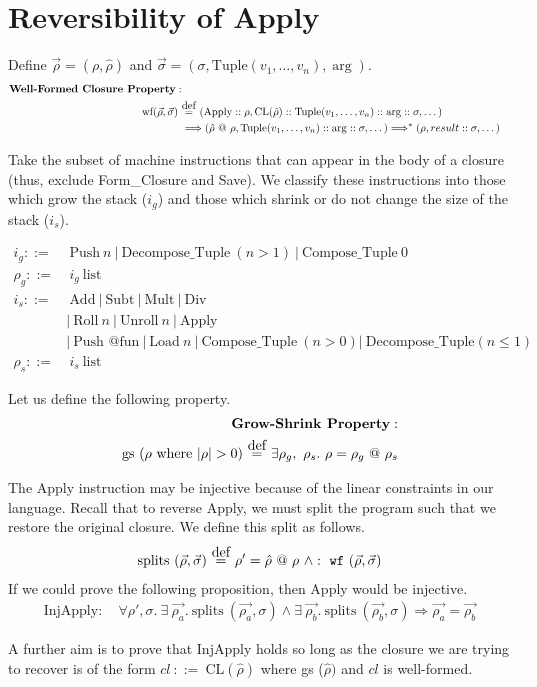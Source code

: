 \documentclass[11pt]{article}
\newcommand\myeq{\stackrel{\mathclap{\normalfont\mbox{def}}}{=}}
\begin{document}
\break{}


\section*{Reversibility of Apply}

Define $\vec{\rho} = (\rho, \hat{\rho})$ and $\vec{\sigma} = (\sigma, \text{Tuple}(v_1, \dots, v_n), \arg)$.
\begin{align*}
\textbf{Well-Formed Closure Property}: \\
    \text{wf} (\vec{\rho}, \vec{\sigma})\ &\myeq\ (\text{Apply}::\rho, \text{CL} (\hat{\rho})::\text{Tuple} (v_1, \dots, v_n)::\arg::\sigma, \dots)\\
    &\Longrightarrow (\hat{\rho}\ @\ \rho, \text{Tuple}(v_1, \dots, v_n)::\arg::\sigma, \dots) \Longrightarrow^* (\rho, result::\sigma, \dots)
\end{align*}

Take the subset of machine instructions that can appear in the body of a closure (thus, exclude Form\_Closure and Save). We classify these instructions into those which grow the stack ($i_g$) and those which shrink or do not change the size of the stack ($i_s$).

\begin{align*}
    i_g ::=&\ \text{Push}\ n\ |\ \text{Decompose\_Tuple}\ (n > 1)\ |\ \text{Compose\_Tuple}\ 0 \\
    \rho_g ::=&\ i_g\ \text{list}\\
    i_s ::=&\ \text {Add}\ |\ \text {Subt}\ |\ \text {Mult}\ |\ \text {Div}\\
    & |\ \text{Roll}\ n\ |\ \text {Unroll}\ n\ |\ \text{Apply}\\
    & |\ \text{Push @fun}\ |\ \text {Load}\ n\ |\ \text{Compose\_Tuple}\ (n > 0) |\ \text{Decompose\_Tuple} (n \le 1)\\
    \rho_s ::=&\ i_s\ \text{list}
\end{align*}

Let us define the following property.
\begin{align*}
    \textbf{Grow-Shrink Property}:\\
    \text{gs}\ (\rho\ \text{where}\ |\rho| > 0)\ \myeq\ \exists \rho_g,\ \rho_s.\ \rho = \rho_g\ @\ \rho_s
\end{align*}

The Apply instruction may be injective because of the linear constraints in our language. Recall that to reverse Apply, we must split the program such that we restore the original closure. We define this split as follows.
\begin{align*}
    \text{splits}\ (\vec{\rho},\vec{\sigma})\ \myeq\ \rho' = \hat{\rho}\ @\ \rho\ \wedge : \ \texttt{wf}\ (\vec{\rho}, \vec{\sigma})
\end{align*}
If we could prove the following proposition, then Apply would be injective.
\begin{align*}
    \text{InjApply}: \quad \forall \rho', \sigma.\ \exists\ \vec{\rho_a}.\ \text{splits}\ (\vec{\rho_a}, \sigma) \wedge \exists\ \vec{\rho_b}.\ \text{splits}\ (\vec{\rho_b}, \sigma) \Longrightarrow \vec{\rho_a} = \vec{\rho_b}
\end{align*}

A further aim is to prove that InjApply holds so long as the closure we are trying to recover is of the form $cl\ ::=\ \text{CL}(\hat{\rho})$ where gs ($\hat{\rho})$ and $cl$ is well-formed.
\end{document}
